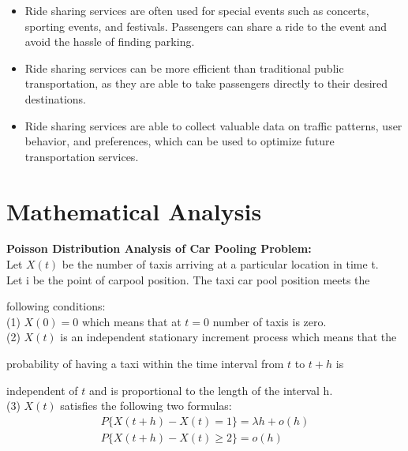 \documentclass{article}
\begin{document}
\begin{itemize}
    \item Ride sharing services are often used for special events such as concerts, sporting events, and festivals. Passengers can share a ride to the event and avoid the hassle of finding parking. \\

    \item Ride sharing services can be more efficient than traditional public transportation, as they are able to take passengers directly to their desired destinations. \\
    
    \item Ride sharing services are able to collect valuable data on traffic patterns, user behavior, and preferences, which can be used to optimize future transportation services. \\
\end{itemize}



\newpage
\section{Mathematical Analysis}
\large 

\textbf{Poisson Distribution Analysis of Car Pooling Problem:} \\

Let $X(t)$ be the number of taxis arriving at a particular location in time t. \\

Let i be the point of carpool position. The taxi car pool position meets the 

following conditions: \\

(1) $X(0) = 0$ which means that at $t = 0$ number of taxis is zero. \\

(2) $X(t)$ is an independent stationary increment process which means that the

probability of having a taxi within the time interval from $t$ to $t+h$ is

independent of $t$ and is proportional to the length of the interval h. \\

(3) $X(t)$ satisfies the following two formulas:
\begin{equation*}
    \begin{split}
        P\{X(t+h) - X(t) = 1\} = \lambda h + o(h) \\
        P\{X(t+h) - X(t) \geq 2\} = o(h)    
    \end{split}
\end{equation*}
\end{document}
